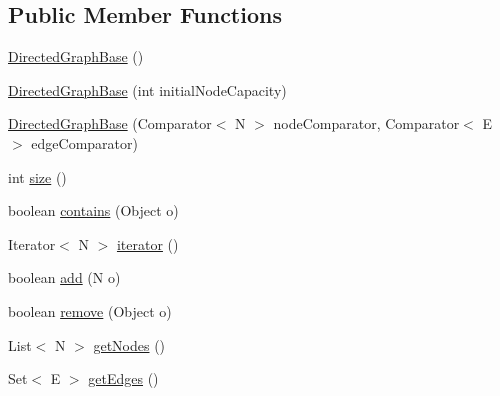 \subsection*{Public Member Functions}
\begin{DoxyCompactItemize}
\item 
\hyperlink{classorg_1_1tzi_1_1use_1_1graph_1_1_directed_graph_base_3_01_n_00_01_e_01extends_01_directed_edge_3_01_n_01_4_01_4_af435756e5aac5342c7b2598417559084}{Directed\-Graph\-Base} ()
\item 
\hyperlink{classorg_1_1tzi_1_1use_1_1graph_1_1_directed_graph_base_3_01_n_00_01_e_01extends_01_directed_edge_3_01_n_01_4_01_4_acd07dba0b6604f2db122b40269818a70}{Directed\-Graph\-Base} (int initial\-Node\-Capacity)
\item 
\hyperlink{classorg_1_1tzi_1_1use_1_1graph_1_1_directed_graph_base_3_01_n_00_01_e_01extends_01_directed_edge_3_01_n_01_4_01_4_a0bf591967edd4f94dbf6dbf9148f8650}{Directed\-Graph\-Base} (Comparator$<$ N $>$ node\-Comparator, Comparator$<$ E $>$ edge\-Comparator)
\item 
int \hyperlink{classorg_1_1tzi_1_1use_1_1graph_1_1_directed_graph_base_3_01_n_00_01_e_01extends_01_directed_edge_3_01_n_01_4_01_4_aacdba48d266c93669fd558dd18bf4764}{size} ()
\item 
boolean \hyperlink{classorg_1_1tzi_1_1use_1_1graph_1_1_directed_graph_base_3_01_n_00_01_e_01extends_01_directed_edge_3_01_n_01_4_01_4_a5e19f64d6487ba9d6cd2060f0c090639}{contains} (Object o)
\item 
Iterator$<$ N $>$ \hyperlink{classorg_1_1tzi_1_1use_1_1graph_1_1_directed_graph_base_3_01_n_00_01_e_01extends_01_directed_edge_3_01_n_01_4_01_4_a5f321f01d7b518747c15f01d82a2cb8b}{iterator} ()
\item 
boolean \hyperlink{classorg_1_1tzi_1_1use_1_1graph_1_1_directed_graph_base_3_01_n_00_01_e_01extends_01_directed_edge_3_01_n_01_4_01_4_adf39899e4e2f4128f624f79f9a9d7cc8}{add} (N o)
\item 
boolean \hyperlink{classorg_1_1tzi_1_1use_1_1graph_1_1_directed_graph_base_3_01_n_00_01_e_01extends_01_directed_edge_3_01_n_01_4_01_4_ae0c888f27c4d9974c1b5dfcd714b142a}{remove} (Object o)
\item 
List$<$ N $>$ \hyperlink{classorg_1_1tzi_1_1use_1_1graph_1_1_directed_graph_base_3_01_n_00_01_e_01extends_01_directed_edge_3_01_n_01_4_01_4_a84c74bc514e4112cc8b411e9c595df9b}{get\-Nodes} ()
\item 
Set$<$ E $>$ \hyperlink{classorg_1_1tzi_1_1use_1_1graph_1_1_directed_graph_base_3_01_n_00_01_e_01extends_01_directed_edge_3_01_n_01_4_01_4_afd0de805c141a17bf5cedf519b86d38e}{get\-Edges} ()

\end{DoxyCompactItemize}
